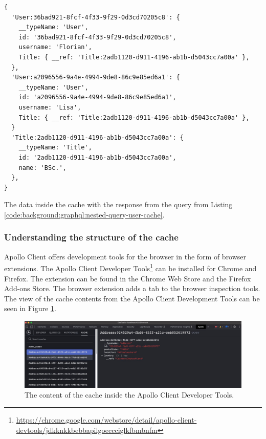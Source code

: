 \ifshowListings
\begin{listing}[H]
    \begin{verbatim}
{
  'User:36bad921-8fcf-4f33-9f29-0d3cd70205c8': {
    __typeName: 'User',
    id: '36bad921-8fcf-4f33-9f29-0d3cd70205c8',
    username: 'Florian',
    Title: { __ref: 'Title:2adb1120-d911-4196-ab1b-d5043cc7a00a' },
  },
  'User:a2096556-9a4e-4994-9de8-86c9e85ed6a1': {
    __typeName: 'User',
    id: 'a2096556-9a4e-4994-9de8-86c9e85ed6a1',
    username: 'Lisa',
    Title: { __ref: 'Title:2adb1120-d911-4196-ab1b-d5043cc7a00a' },
  }
  'Title:2adb1120-d911-4196-ab1b-d5043cc7a00a': {
    __typeName: 'Title',
    id: '2adb1120-d911-4196-ab1b-d5043cc7a00a',
    name: 'BSc.',
  },
}
    \end{verbatim}
    \caption{The data inside the cache with the response from the query from Listing \ref{code:background:graphql:nested-query-user-cache}.}\label{code:background:graphql:nested-query-user-cache-representation}
\end{listing}
\fi

\subsubsection{Understanding the structure of the cache}\label{subsubsection:background:graphql:apollo-server-client:understanding-cache-structure}

Apollo Client offers development tools for the browser in the form of browser extensions. The Apollo Client Developer Tools\footnote{\url{https://chrome.google.com/webstore/detail/apollo-client-devtools/jdkknkkbebbapilgoeccciglkfbmbnfm}} can be installed for Chrome and Firefox. The extension can be found in the Chrome Web Store and the Firefox Add-ons Store. The browser extension adds a tab to the browser inspection tools. \cite{misc:-:background:graphql:apollo-developer-tools} The view of the cache contents from the Apollo Client Development Tools can be seen in Figure \ref{fig:background:graphql:apollo:apollo-dev-tools}.

\ifshowImages
  \begin{figure}[H]
    \centering
    \includegraphics[width=1\linewidth]{images/background/graphql/apollo/apollo-dev-tools.jpg}
    \caption{The content of the cache inside the Apollo Client Developer Tools.}\label{fig:background:graphql:apollo:apollo-dev-tools}
  \end{figure}
\fi

